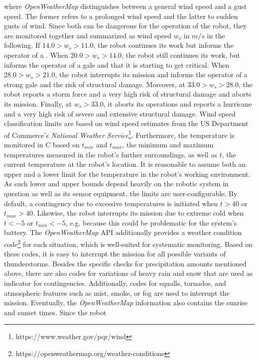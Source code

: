 \documentclass[english, master, utf8]{base/thesis_KBS}
\begin{document}
where \textit{OpenWeatherMap} distinguishes between a general wind speed and a gust speed. The former refers to a prolonged wind speed and the latter to sudden gusts of wind.
Since both can be dangerous for the operation of the robot, they are monitored together and summarized as wind speed $w_s$ in $m/s$ in the following. If $14.0 > w_s > 11.0$, the
robot continues its work but informs the operator of a . When $20.0 > w_s > 14.0$, the robot still continues its work, but informs the operator of a gale
and that it is starting to get critical. When $28.0 > w_s > 21.0$, the robot interrupts its mission and informs the operator of a strong gale and the risk of structural damage.
Moreover, at $33.0 > w_s > 28.0$, the robot reports a storm force and a very high risk of structural damage and aborts its mission. Finally, at $w_s > 33.0$, it aborts its operations
and reports a hurricane and a very high risk of severe and extensive structural damage. Wind speed classification limits are based on wind speed estimates from the US Department of
Commerce's \textit{National Weather Service}\footnote{https://www.weather.gov/pqr/wind}. Furthermore, the temperature is monitored in \textdegree{}C based on $t_{min}$ and $t_{max}$,
the minimum and maximum temperatures measured in the robot's further surroundings, as well as $t$, the current temperature at the robot's location. It is reasonable to assume both
an upper and a lower limit for the temperature in the robot's working environment. As such lower and upper bounds depend heavily on the robotic system in question as well as its
sensor equipment, the limits are user-configurable. By default, a contingency due to excessive temperatures is initiated when $t > 40$ or $t_{max} > 40$. Likewise, the robot
interrupts its mission due to extreme cold when $t < -5$ or $t_{min} < -5$, e.g. because this could be problematic for the system's battery. The \textit{OpenWeatherMap} API
additionally provides a weather condition code\footnote{https://openweathermap.org/weather-conditions} for each situation, which is well-suited for systematic monitoring.
Based on these codes, it is easy to interrupt the mission for all possible variants of thunderstorms. Besides the specific checks for precipitation amounts mentioned above,
there are also codes for variations of heavy rain and snow that are used as indicator for contingencies. Additionally, codes for squalls, tornados, and atmospheric features
such as mist, smoke, or fog are used to interrupt the mission. Eventually, the \textit{OpenWeatherMap} information also contains the sunrise and sunset times. Since the robot
\end{document}

